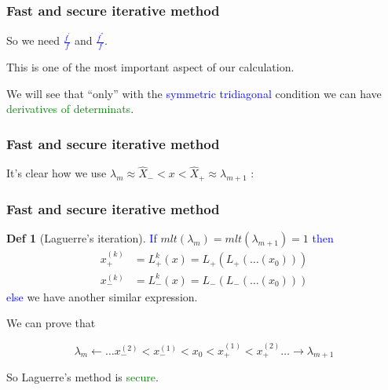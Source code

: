 \documentclass{beamer}
\theoremstyle{definition} \newtheorem{de}{Def}
\theoremstyle{remark} \newtheorem{os}[de]{Remark}
\theoremstyle{plain} \newtheorem{te}[de]{Teo}
\theoremstyle{plain} \newtheorem{co}[de]{Cor}
\theoremstyle{plain} \newtheorem{pr}[de]{Prop}
\theoremstyle{plain} \newtheorem{lem}[de]{Lemm}
\theoremstyle{remark} \newtheorem{rem}[de]{Remark}
\begin{document}
\begin{frame}
  \frametitle{Fast and secure iterative method}
  So we need \textcolor{blue}{$\frac{f^{'}}{f}$} and \textcolor{blue}{$\frac{f^{''}}{f}$}. \\

\pause

This is one of the most important aspect of our calculation. \\

\pause

We will see that ``only'' with the \textcolor{blue}{symmetric tridiagonal} condition we can have \textcolor{green}{derivatives of determinats}.
\end{frame}


\begin{frame}
\frametitle{Fast and secure iterative method}

It's clear how we use $\lambda_m \approx \hat X_{-} < x < \hat X_{+} \approx \lambda_{m+1}$ :


\end{frame}



\begin{frame}[label=BeforeLagProof]
\frametitle{Fast and secure iterative method}

\begin{de}[Laguerre's iteration]
  \textcolor{blue}{If} $mlt(\lambda_m)=mlt(\lambda_{m+1})=1$ \textcolor{blue}{then}
  \begin{align*}
    x_{+}^{(k)} &= L_{+}^k(x)=L_{+}(L_{+}(\dots(x_{0})))\\
    x_{-}^{(k)} &= L_{-}^k(x)=L_{-}(L_{-}(\dots(x_{0})))
  \end{align*}
  \textcolor{blue}{else} we have another similar expression.
\end{de} 

\pause

\hyperlink{LagProof}{} We can prove that

\begin{equation*}
  \lambda_m \leftarrow \dots x_{-}^{(2)} < x_{-}^{(1)} < x_{0} < x_{+}^{(1)} < x_{+}^{(2)} \dots \rightarrow \lambda_{m+1}
\end{equation*}
  
\pause

So Laguerre's method is \textcolor{green}{secure}.

\end{frame}
\end{document}
